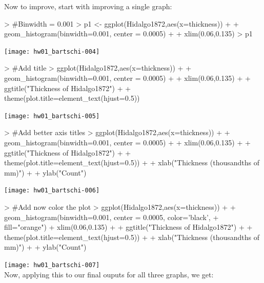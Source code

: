 \documentclass[12pt,letterpaper,final]{article}
\begin{document}
\begin{enumerate}
\begin{enumerate}
Now to improve, start with improving a single graph:

\begin{Schunk}
\begin{Sinput}
> #Binwidth = 0.001
> p1 <- ggplot(Hidalgo1872,aes(x=thickness)) + 
+   geom_histogram(binwidth=0.001, center = 0.0005) +
+   xlim(0.06,0.135)
> p1
\end{Sinput}
\end{Schunk}
\texttt{[image: hw01\_bartschi-004]}

\begin{Schunk}
\begin{Sinput}
> #Add title
> ggplot(Hidalgo1872,aes(x=thickness)) + 
+   geom_histogram(binwidth=0.001, center = 0.0005) +
+   xlim(0.06,0.135) +
+   ggtitle("Thickness of Hidalgo1872") + 
+   theme(plot.title=element_text(hjust=0.5))
\end{Sinput}
\end{Schunk}
\texttt{[image: hw01\_bartschi-005]}

\begin{Schunk}
\begin{Sinput}
> #Add better axis titles
> ggplot(Hidalgo1872,aes(x=thickness)) + 
+   geom_histogram(binwidth=0.001, center = 0.0005) +
+   xlim(0.06,0.135) +
+   ggtitle("Thickness of Hidalgo1872") + 
+   theme(plot.title=element_text(hjust=0.5)) +
+   xlab("Thickness (thousandths of mm)") +
+   ylab("Count")
\end{Sinput}
\end{Schunk}
\texttt{[image: hw01\_bartschi-006]}

\begin{Schunk}
\begin{Sinput}
> #Add now color the plot
> ggplot(Hidalgo1872,aes(x=thickness)) + 
+   geom_histogram(binwidth=0.001, center = 0.0005, color='black',
+                  fill="orange") + xlim(0.06,0.135) +
+   ggtitle("Thickness of Hidalgo1872") + 
+   theme(plot.title=element_text(hjust=0.5)) +
+   xlab("Thickness (thousandths of mm)") +
+   ylab("Count")
\end{Sinput}
\end{Schunk}
\texttt{[image: hw01\_bartschi-007]}
~\\
Now, applying this to our final ouputs for all three graphs, we get:


\end{enumerate}
\end{enumerate}
\end{document}
